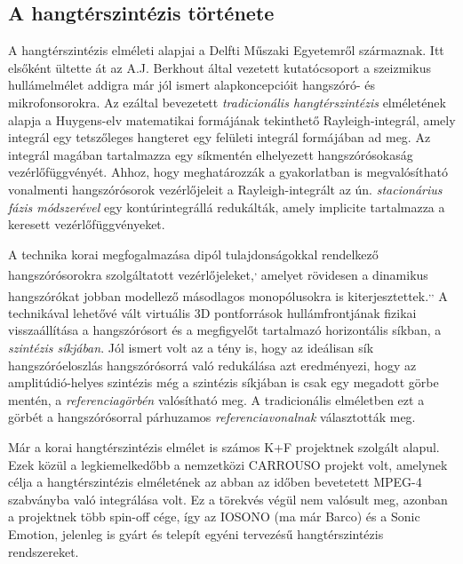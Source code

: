 \documentclass[10pt,twoside]{article}
\theoremstyle{thesisgroupstyle}
\theoremstyle{indented}
\begin{document}
\subsection{A hangtérszintézis története}
%
A hangtérszintézis elméleti alapjai a Delfti Műszaki Egyetemről származnak. 
Itt elsőként ültette át az A.J. Berkhout által vezetett kutatócsoport a szeizmikus hullámelmélet addigra már jól ismert alapkoncepcióit hangszóró- és mikrofonsorokra.
Az ezáltal bevezetett \emph{tradicionális hangtérszintézis} elméletének alapja a Huygens-elv matematikai formájának tekinthető Rayleigh-integrál, amely integrál egy tetszőleges hangteret egy felületi integrál formájában ad meg.
Az integrál magában tartalmazza egy síkmentén elhelyezett hangszórósokaság vezérlőfüggvényét.
Ahhoz, hogy meghatározzák a gyakorlatban is megvalósítható vonalmenti hangszórósorok vezérlőjeleit a Rayleigh-integrált az ún. \emph{stacionárius fázis módszerével} egy kontúrintegrállá redukálták, amely implicite tartalmazza a keresett vezérlőfüggvényeket.

A technika korai megfogalmazása dipól tulajdonságokkal rendelkező hangszórósorokra szolgáltatott vezérlőjeleket,\textsuperscript{,} amelyet rövidesen a dinamikus hangszórókat jobban modellező másodlagos monopólusokra is kiterjesztettek.\textsuperscript{,}\textsuperscript{,}
A technikával lehetővé vált virtuális 3D pontforrások hullámfrontjának fizikai visszaállítása a hangszórósort és a megfigyelőt tartalmazó horizontális síkban, a \emph{szintézis síkjában}.
Jól ismert volt az a tény is, hogy az ideálisan sík hangszóróeloszlás hangszórósorrá való redukálása azt eredményezi, hogy az amplitúdió-helyes szintézis még a szintézis síkjában is csak egy megadott görbe mentén, a \emph{referenciagörbén} valósítható meg.
A tradicionális elméletben ezt a görbét a hangszórósorral párhuzamos \emph{referenciavonalnak} választották meg.

Már a korai hangtérszintézis elmélet is számos K+F projektnek szolgált alapul. 
Ezek közül a legkiemelkedőbb a nemzetközi CARROUSO projekt volt, amelynek célja a hangtérszintézis elméletének az abban az időben bevetetett MPEG-4 szabványba való integrálása volt.
Ez a törekvés végül nem valósult meg, azonban a projektnek több spin-off cége, így az IOSONO (ma már Barco) és a Sonic Emotion, jelenleg is gyárt és telepít egyéni tervezésű hangtérszintézis rendszereket.
\end{document}
